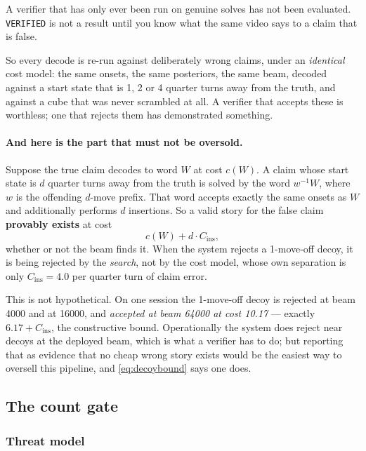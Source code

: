A verifier that has only ever been run on genuine solves has not been
evaluated. \texttt{VERIFIED} is not a result until you know what the same
video says to a claim that is false.

So every decode is re-run against deliberately wrong claims, under an
\emph{identical} cost model: the same onsets, the same posteriors, the same
beam, decoded against a start state that is 1, 2 or 4 quarter turns away
from the truth, and against a cube that was never scrambled at all. A
verifier that accepts these is worthless; one that rejects them has
demonstrated something.

\paragraph{And here is the part that must not be oversold.} Suppose the true
claim decodes to word $W$ at cost $c(W)$. A claim whose start state is $d$
quarter turns away from the truth is solved by the word $w^{-1}W$, where $w$
is the offending $d$-move prefix. That word accepts exactly the same onsets
as $W$ and additionally performs $d$ insertions. So a valid story for the
false claim \textbf{provably exists} at cost
\begin{equation}
c(W) + d\cdot C_{\mathrm{ins}},
\label{eq:decoybound}
\end{equation}
whether or not the beam finds it. When the system rejects a 1-move-off
decoy, it is being rejected by the \emph{search}, not by the cost model,
whose own separation is only $C_{\mathrm{ins}} = 4.0$ per quarter turn of
claim error.

This is not hypothetical. On one session the 1-move-off decoy is rejected at
beam 4000 and at 16000, and \emph{accepted at beam 64000 at cost 10.17} ---
exactly $6.17 + C_{\mathrm{ins}}$, the constructive bound. Operationally the
system does reject near decoys at the deployed beam, which is what a
verifier has to do; but reporting that as evidence that no cheap wrong story
exists would be the easiest way to oversell this pipeline, and
\cref{eq:decoybound} says one does.

\subsection{The count gate}
\label{sec:count-gate}

\subsubsection{Threat model}

